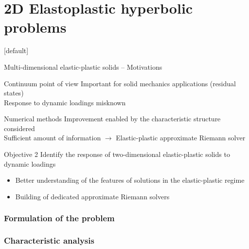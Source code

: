 \documentclass[11pt,aspectratio=169]{beamer}
\makeatletter
\let\oldpart\part
\def\part#1{\def\@currentlabelname{#1}\oldpart{#1}}
\newenvironment{withoutheadline}{
  \setbeamertemplate{headline}[default]
  \def\beamer@entrycode{\vspace*{-\headheight}}
}{}
\makeatother
\begin{document}
\part{2D Elastoplastic hyperbolic problems}
\label{part:part2}
\begin{withoutheadline}
\begin{frame}{Multi-dimensional elastic-plastic solids -- Motivations}
  
  \begin{block}{Continuum point of view}
    Important for solid mechanics applications (residual states)\\
    Response to dynamic loadings misknown %
  \end{block}
  
  \begin{block}{Numerical methods}
    Improvement enabled by the characteristic structure considered \\
    Sufficient amount of information \alert{$\rightarrow$ Elastic-plastic approximate Riemann solver}
  \end{block}
  \pause
  \begin{block}{Objective 2}
    Identify the response of two-dimensional elastic-plastic solids to dynamic loadings
    \begin{itemize}
    \item Better understanding of the features of solutions in the elastic-plastic regime
    \item Building of dedicated approximate Riemann solvers
    \end{itemize}
  \end{block}
\end{frame}
\end{withoutheadline}

\section{Formulation of the problem}


\section{Characteristic analysis}

\end{document}
